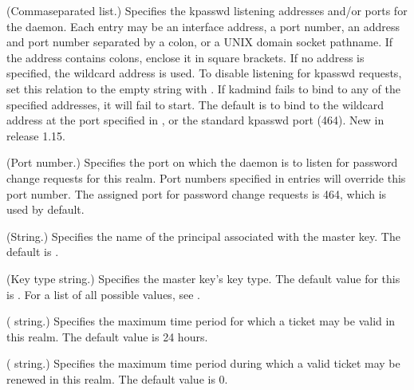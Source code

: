\documentclass[letterpaper,10pt,english]{sphinxmanual}
\begin{document}
\begin{description}
\sphinxAtStartPar
(Comma\sphinxhyphen{}separated list.)  Specifies the kpasswd listening
addresses and/or ports for the {\hyperref[\detokenize{admin/admin_commands/kadmind:kadmind-8}]{}} daemon.  Each
entry may be an interface address, a port number, an address and
port number separated by a colon, or a UNIX domain socket
pathname.  If the address contains colons, enclose it in square
brackets.  If no address is specified, the wildcard address is
used.  To disable listening for kpasswd requests, set this
relation to the empty string with .  If
kadmind fails to bind to any of the specified addresses, it will
fail to start.  The default is to bind to the wildcard address at
the port specified in , or the standard kpasswd
port (464).  New in release 1.15.

\sphinxAtStartPar
(Port number.)  Specifies the port on which the {\hyperref[\detokenize{admin/admin_commands/kadmind:kadmind-8}]{}}
daemon is to listen for password change requests for this realm.
Port numbers specified in  entries will override
this port number.  The assigned port for password change requests
is 464, which is used by default.

\sphinxAtStartPar
(String.)  Specifies the name of the principal associated with the
master key.  The default is .

\sphinxAtStartPar
(Key type string.)  Specifies the master key’s key type.  The
default value for this is .  For a list of all possible
values, see {\hyperref[\detokenize{admin/conf_files/kdc_conf:encryption-types}]{}}.

\sphinxAtStartPar
( string.)  Specifies the maximum time period for
which a ticket may be valid in this realm.  The default value is
24 hours.

\sphinxAtStartPar
( string.)  Specifies the maximum time period
during which a valid ticket may be renewed in this realm.
The default value is 0.


\end{description}
\end{document}
